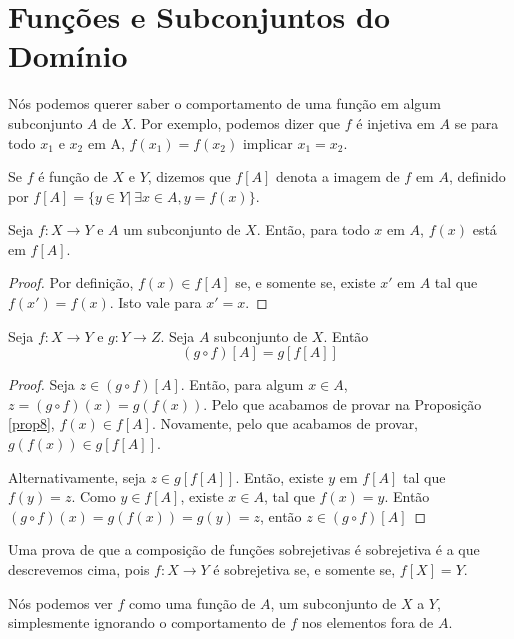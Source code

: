 \section{Funções e Subconjuntos do Domínio}

Nós podemos querer saber o comportamento de uma função em algum subconjunto
$A$ de  $X$. Por exemplo, podemos dizer que $f$ é injetiva em $A$ se para 
todo $x_1$ e $x_2$ em A, $f(x_1) = f(x_2) $ implicar $x_1 = x_2 $. 

\begin{definition}
    \label{def8}
    Se $f$ é função de $X$ e $Y$, dizemos que $f[A]$ denota a imagem de $f$ em 
    $A$, definido por $f[A] = \{y \in Y | ~\exists x \in A, y = f(x)\}$.        
\end{definition}

\begin{theorem}
    \label{prop7}
    Seja $f: X \to Y $ e $A$ um subconjunto de $X$. Então, para todo $x$ em 
    $A$, $f(x)$ está em $f[A]$. 
\end{theorem}

\begin{proof}
    Por definição, $f(x) \in f[A] $ se, e somente se, existe $x'$ em $A$ tal que
    $f(x') = f(x)$. Isto vale para  $x' = x $. 
\end{proof}

\begin{theorem}
    \label{prop8}
    Seja $f: X \to Y$ e $g: Y \to Z$. Seja $A$ subconjunto de $X$. Então
    $$(g \circ f)[A] = g[f[A]]$$ 
\end{theorem}

\begin{proof}
    Seja $z \in (g \circ f)[A]$. Então, para algum $x \in A$, $z = (g \circ f)(x) = g(f(x))$.
    Pelo que acabamos de provar na Proposição \ref{prop8}, $f(x) \in f[A]$. Novamente, pelo 
    que acabamos de provar, $g(f(x)) \in g[f[A]] $. 
    
    Alternativamente, seja $z \in g[f[A]]$. Então, existe $y$ em $f[A]$ tal que 
    $f(y) = z$. Como $y \in f[A]$, existe $x \in A$, tal que $f(x) = y$. Então 
    $(g \circ f)(x) = g(f(x)) = g(y) = z$, então $z \in (g \circ f)[A] $
\end{proof}

Uma prova de que a composição de funções sobrejetivas é 
sobrejetiva é a que descrevemos cima, pois $f: X \to Y$ é 
sobrejetiva se, e somente se, $f[X] = Y$. 

Nós podemos ver $f$ como uma função de $A$, um subconjunto de $X$ a $Y$, simplesmente 
ignorando o comportamento de $f$ nos elementos fora de $A$. 

